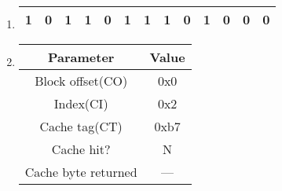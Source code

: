 \documentclass{article}
\begin{document}
\begin{enumerate}[label=\textbf{\Alph*.}]
	\item
	\begin{tabular}{|c|c|c|c|c|c|c|c|c|c|c|c|c|}
		\hline
		1 & 0 & 1 & 1 & 0 & 1 & 1 & 1 & 0 & 1 & 0 & 0 & 0 \\
		\hline
	\end{tabular}
	\item
	\begin{tabular}{c c}
		Parameter & Value \\
		\hline
		Block offset(CO) & 0x0 \\
		Index(CI) & 0x2 \\
		Cache tag(CT) & 0xb7 \\
		Cache hit? & N \\
		Cache byte returned & --- \\
	\end{tabular}
\end{enumerate}
\end{document}
